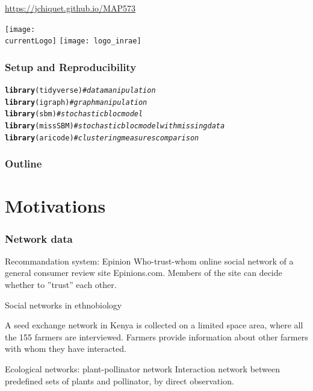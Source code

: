 \documentclass{beamer}\usepackage[]{graphicx}\usepackage[]{color}
\title{\currentCourse}
\subtitle{\huge\currentChapter\normalsize}
\institute{\currentInstitute}
\date{\currentDate}
\makeatletter
\newcommand{\hlcom}[1]{\textcolor[rgb]{0.678,0.584,0.686}{\textit{#1}}}%
\newcommand{\hlstd}[1]{\textcolor[rgb]{0.345,0.345,0.345}{#1}}%
\newcommand{\hlkwd}[1]{\textcolor[rgb]{0.737,0.353,0.396}{\textbf{#1}}}%
\newenvironment{kframe}{%
 \def\at@end@of@kframe{}%
 \ifinner\ifhmode%
  \def\at@end@of@kframe{\end{minipage}}%
  \begin{minipage}{\columnwidth}%
 \fi\fi%
 \def\FrameCommand##1{\hskip\@totalleftmargin \hskip-\fboxsep
 \colorbox{shadecolor}{##1}\hskip-\fboxsep
     \hskip-\linewidth \hskip-\@totalleftmargin \hskip\columnwidth}%
 \MakeFramed {\advance\hsize-\width
   \@totalleftmargin\z@ \linewidth\hsize
   \@setminipage}}%
 {\par\unskip\endMakeFramed%
 \at@end@of@kframe}
\newenvironment{knitrout}{}{} %
\def\currentLogo{../common_figs/logo_X}
\newcommand{\dotitlepage}{%
  \begin{frame}
    \titlepage
    \vfill
    \begin{center}
        \scriptsize\url{https://jchiquet.github.io/MAP573}
    \end{center}
    \vfill
    \texttt{[image: \\currentLogo]}\hfill
    \texttt{[image: logo\_inrae]}
  \end{frame}
}
\makeatother
\begin{document}
\dotitlepage

\begin{frame}[fragile]
  \frametitle{Setup and Reproducibility}
  
\begin{knitrout}\scriptsize
{}\color{fgcolor}\begin{kframe}
\begin{alltt}
\hlkwd{library}\hlstd{(tidyverse)} \hlcom{# data manipulation}
\hlkwd{library}\hlstd{(igraph)}    \hlcom{# graph manipulation}
\hlkwd{library}\hlstd{(sbm)}       \hlcom{# stochastic bloc model}
\hlkwd{library}\hlstd{(missSBM)}   \hlcom{# stochastic bloc model with missing data}
\hlkwd{library}\hlstd{(aricode)}   \hlcom{# clustering measures comparison}
\end{alltt}
\end{kframe}
\end{knitrout}



\end{frame}

\begin{frame}
  \frametitle{Outline}
  \tableofcontents
\end{frame}

\section{Motivations}

\begin{frame}
  \frametitle{Network data}

  \begin{block}{Recommandation system: Epinion}
Who-trust-whom online social network of a general consumer review site Epinions.com. Members of the site can decide whether to ''trust'' each other. 

\end{block}

\begin{block}{Social networks in ethnobiology}

A seed exchange network in Kenya is collected on a limited space area, where all the 155 farmers are interviewed. Farmers provide information about other farmers with whom they have interacted.

\end{block}

\begin{block}{Ecological networks: plant-pollinator network}
Interaction network between predefined sets of plants and pollinator, by direct observation.
\end{block}

\end{frame}
\end{document}
